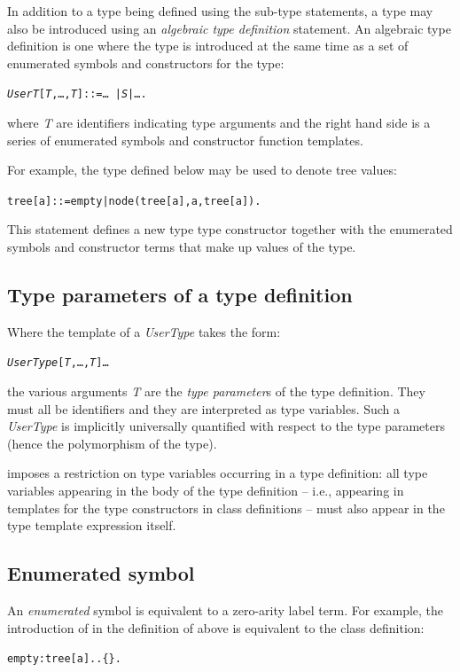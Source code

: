 In addition to a type being defined using the sub-type statements, a type may also be introduced using an \emph{algebraic type definition} statement. An algebraic type definition is one where the type is introduced at the same time as a set of enumerated symbols and constructors for the type:
\begin{alltt}
\emph{UserT}[\emph{T},\dots,\emph{T}\subn] ::= \dots\ | \emph{S} | \dots.
\end{alltt}
where \emph{T\subi} are identifiers indicating type arguments and the right hand side is a series of enumerated symbols and constructor function templates.

For example, the  type defined below may be used to denote tree values:

\begin{alltt}
tree[a] ::= empty | node(tree[a],a,tree[a]).
\end{alltt}
This statement defines a new type type constructor  together with the enumerated symbols and constructor terms that make up values of the  type.

\subsection{Type parameters of a type definition}
\label{type:parameter}

Where the template of a \emph{UserType} takes the form:
\begin{alltt}
\emph{UserType}[\emph{T},\dots,\emph{T}\subn] \impl \ldots
\end{alltt}
the various arguments \emph{T\subi} are the \emph{type parameter}s of the type definition. They must all be identifiers and they are interpreted as type variables. Such a \emph{UserType} is implicitly universally quantified with respect to the type parameters (hence the polymorphism of the type).

\go imposes a restriction on type variables occurring in a type definition: all type variables appearing in the body of the type definition -- i.e., appearing in templates for the type constructors in class definitions -- must also appear in the type template expression itself.

\subsection{Enumerated symbol}
\label{type:user-symbol}
An \emph{enumerated} symbol is equivalent to a zero-arity label term. For example, the introduction of  in the definition of  above is equivalent to the class definition:
\begin{alltt}
empty:tree[a] .. \{\}.
\end{alltt}


